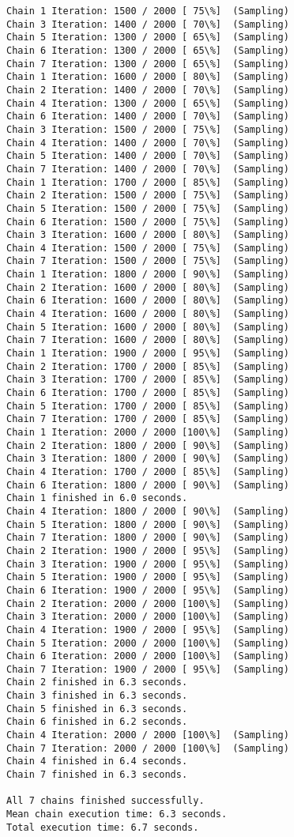 \documentclass[11pt]{article}
\begin{document}
\begin{Verbatim}[commandchars=\\\{\}]
Chain 1 Iteration: 1500 / 2000 [ 75\%]  (Sampling)
Chain 3 Iteration: 1400 / 2000 [ 70\%]  (Sampling)
Chain 5 Iteration: 1300 / 2000 [ 65\%]  (Sampling)
Chain 6 Iteration: 1300 / 2000 [ 65\%]  (Sampling)
Chain 7 Iteration: 1300 / 2000 [ 65\%]  (Sampling)
Chain 1 Iteration: 1600 / 2000 [ 80\%]  (Sampling)
Chain 2 Iteration: 1400 / 2000 [ 70\%]  (Sampling)
Chain 4 Iteration: 1300 / 2000 [ 65\%]  (Sampling)
Chain 6 Iteration: 1400 / 2000 [ 70\%]  (Sampling)
Chain 3 Iteration: 1500 / 2000 [ 75\%]  (Sampling)
Chain 4 Iteration: 1400 / 2000 [ 70\%]  (Sampling)
Chain 5 Iteration: 1400 / 2000 [ 70\%]  (Sampling)
Chain 7 Iteration: 1400 / 2000 [ 70\%]  (Sampling)
Chain 1 Iteration: 1700 / 2000 [ 85\%]  (Sampling)
Chain 2 Iteration: 1500 / 2000 [ 75\%]  (Sampling)
Chain 5 Iteration: 1500 / 2000 [ 75\%]  (Sampling)
Chain 6 Iteration: 1500 / 2000 [ 75\%]  (Sampling)
Chain 3 Iteration: 1600 / 2000 [ 80\%]  (Sampling)
Chain 4 Iteration: 1500 / 2000 [ 75\%]  (Sampling)
Chain 7 Iteration: 1500 / 2000 [ 75\%]  (Sampling)
Chain 1 Iteration: 1800 / 2000 [ 90\%]  (Sampling)
Chain 2 Iteration: 1600 / 2000 [ 80\%]  (Sampling)
Chain 6 Iteration: 1600 / 2000 [ 80\%]  (Sampling)
Chain 4 Iteration: 1600 / 2000 [ 80\%]  (Sampling)
Chain 5 Iteration: 1600 / 2000 [ 80\%]  (Sampling)
Chain 7 Iteration: 1600 / 2000 [ 80\%]  (Sampling)
Chain 1 Iteration: 1900 / 2000 [ 95\%]  (Sampling)
Chain 2 Iteration: 1700 / 2000 [ 85\%]  (Sampling)
Chain 3 Iteration: 1700 / 2000 [ 85\%]  (Sampling)
Chain 6 Iteration: 1700 / 2000 [ 85\%]  (Sampling)
Chain 5 Iteration: 1700 / 2000 [ 85\%]  (Sampling)
Chain 7 Iteration: 1700 / 2000 [ 85\%]  (Sampling)
Chain 1 Iteration: 2000 / 2000 [100\%]  (Sampling)
Chain 2 Iteration: 1800 / 2000 [ 90\%]  (Sampling)
Chain 3 Iteration: 1800 / 2000 [ 90\%]  (Sampling)
Chain 4 Iteration: 1700 / 2000 [ 85\%]  (Sampling)
Chain 6 Iteration: 1800 / 2000 [ 90\%]  (Sampling)
Chain 1 finished in 6.0 seconds.
Chain 4 Iteration: 1800 / 2000 [ 90\%]  (Sampling)
Chain 5 Iteration: 1800 / 2000 [ 90\%]  (Sampling)
Chain 7 Iteration: 1800 / 2000 [ 90\%]  (Sampling)
Chain 2 Iteration: 1900 / 2000 [ 95\%]  (Sampling)
Chain 3 Iteration: 1900 / 2000 [ 95\%]  (Sampling)
Chain 5 Iteration: 1900 / 2000 [ 95\%]  (Sampling)
Chain 6 Iteration: 1900 / 2000 [ 95\%]  (Sampling)
Chain 2 Iteration: 2000 / 2000 [100\%]  (Sampling)
Chain 3 Iteration: 2000 / 2000 [100\%]  (Sampling)
Chain 4 Iteration: 1900 / 2000 [ 95\%]  (Sampling)
Chain 5 Iteration: 2000 / 2000 [100\%]  (Sampling)
Chain 6 Iteration: 2000 / 2000 [100\%]  (Sampling)
Chain 7 Iteration: 1900 / 2000 [ 95\%]  (Sampling)
Chain 2 finished in 6.3 seconds.
Chain 3 finished in 6.3 seconds.
Chain 5 finished in 6.3 seconds.
Chain 6 finished in 6.2 seconds.
Chain 4 Iteration: 2000 / 2000 [100\%]  (Sampling)
Chain 7 Iteration: 2000 / 2000 [100\%]  (Sampling)
Chain 4 finished in 6.4 seconds.
Chain 7 finished in 6.3 seconds.

All 7 chains finished successfully.
Mean chain execution time: 6.3 seconds.
Total execution time: 6.7 seconds.

    \end{Verbatim}
\end{document}
